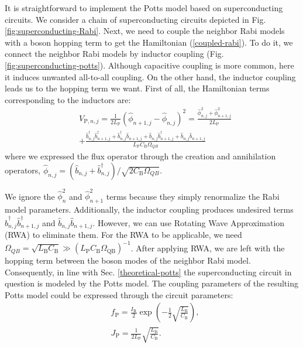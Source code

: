 \documentclass[reprint, aps, prx, amsmath, amssymb, longbibliography, superscriptaddress]{revtex4-2}
\begin{document}
It is straightforward to implement the Potts model based on superconducting circuits. We consider a chain of superconducting circuits depicted in Fig. \ref{fig:superconducting-Rabi}. Next, we need to couple the neighbor Rabi models with a boson hopping term to get the Hamiltonian (\ref{coupled-rabi}). To do it, we connect the neighbor Rabi models by inductor coupling (Fig. \ref{fig:superconducting-potts}). Although capacitive coupling is more common, here it induces unwanted  all-to-all coupling. On the other hand, the inductor coupling leads us to the hopping term we want. First of all, the Hamiltonian terms corresponding to the inductors are:
\begin{equation}
\begin{aligned}
    &V_{\text{P},n,j} = \frac{1}{2L_{\text{P}}} (\hat \phi_{n+1,j} - \hat \phi_{n,j})^2 = \frac{\hat \phi_{n,j}^2 + \hat \phi_{n+1,j}^2}{2L_{\text{P}}} \\
    &+ \frac{\hat b^{\dagger}_{n,j} \hat b^{\dagger}_{n+1,j} + \hat b^{\dagger}_{n,j} \hat b_{n+1,j} + \hat b_{n,j} \hat b^{\dagger}_{n+1,j} + \hat b_{n,j} \hat b_{n+1,j}}{L_{\text{P}}C_{\text{B}}\Omega_{QB}} 
\end{aligned}
\end{equation}
where we expressed the flux operator through the creation and annihilation operators, $\hat \phi_{n,j} = (\hat b_{n,j} + \hat b_{n,j}^{\dagger})/\sqrt{2C_{\text{B}} \Omega_{QB}}$.

We ignore the $ \hat \phi_n^2 $ and $ \hat \phi_{n+1}^2 $ terms because they simply renormalize the Rabi model parameters. Additionally, the inductor coupling produces undesired terms $\hat b^{\dagger}_{n,j} \hat b^{\dagger}_{n+1,j}$ and $\hat b_{n,j} \hat b_{n+1,j}$. However, we can use Rotating Wave Approximation (RWA) to eliminate them. For the RWA to be applicable, we need $\Omega_{QB} = \sqrt{L_{\text{B}} C_{\text{B}}} \gg (L_{\text{P}} C_{\text{B}} \Omega_{\text{QB}})^{-1}$. After applying RWA, we are left with the hopping term between the boson modes of the neighbor Rabi model. Consequently, in line with Sec. \ref{theoretical-potts} the superconducting circuit in question is modeled by the Potts model. The coupling parameters of the resulting Potts model could be expressed through the circuit parameters:
\begin{equation}
\begin{aligned}
    &f_{\text{P}} = \frac{I_{\text{R}}}{2} \exp\left(-\frac{1}{2}\sqrt{\frac{L_{\text{B}}}{C_{\text{B}}}}\right), \\
    &J_{\text{P}} = \frac{1}{2L_{\text{P}}}\sqrt{\frac{L_{\text{B}}}{C_{\text{B}}}}. 
\end{aligned}
\end{equation}
\end{document}
